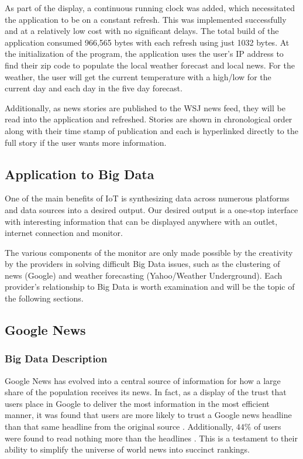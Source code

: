 \documentclass[sigconf]{acmart}
\begin{document}
As part of the display, a continuous running clock was added, which necessitated the application to be on a constant refresh. This was implemented successfully and at a relatively low cost with no significant delays. The total build of the application consumed 966,565 bytes with each refresh using just 1032 bytes. 
At the initialization of the program, the application uses the user's IP address to find their zip code to populate the local weather forecast and local news. For the weather, the user will get the current temperature with a high/low for the current day and each day in the five day forecast.

Additionally, as news stories are published to the WSJ news feed, they will be read into the application and refreshed. Stories are shown in chronological order along with their time stamp of publication and each is hyperlinked directly to the full story if the user wants more information. 

\subsection{Application to Big Data}
One of the main benefits of IoT is synthesizing data across numerous platforms and data sources into a desired output. Our desired output is a one-stop interface with interesting information that can be displayed anywhere with an outlet, internet connection and monitor. 

The various components of the monitor are only made possible by the creativity by the providers in solving difficult Big Data issues, such as the  clustering of news (Google) and weather forecasting (Yahoo/Weather Underground). Each provider's relationship to Big Data is worth examination and will be the topic of the following sections. 

\subsection{Google News}
\subsubsection{Big Data Description}
Google News has evolved into a central source of information for how a large share of the population receives its news. In fact, as a display of the trust that users place in Google to deliver the most information in the most efficient manner, it was found that users are more likely to trust a Google news headline than that same headline from the original source \cite{edelman}. Additionally, $44\%$ of users were found to read nothing more than the headlines \cite{googleheadlines}. This is a testament to their ability to simplify the universe of world news into succinct rankings. 
\end{document}
